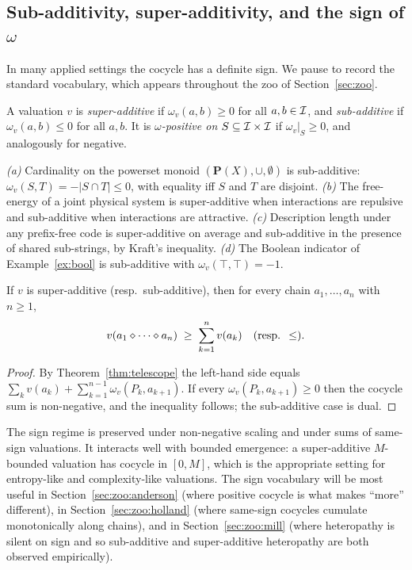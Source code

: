 \subsection*{Sub-additivity, super-additivity, and the sign of $\omega$}

In many applied settings the cocycle has a definite sign. We pause to record
the standard vocabulary, which appears throughout the zoo of
Section~\ref{sec:zoo}.

\begin{definition}\label{def:sign}
A valuation $v$ is \emph{super-additive} if $\omega_v(a,b) \ge 0$ for all
$a, b \in \mathcal{I}$, and \emph{sub-additive} if $\omega_v(a,b) \le 0$ for
all $a, b$. It is \emph{$\omega$-positive on $S \subseteq \mathcal{I}\times
\mathcal{I}$} if $\omega_v|_S \ge 0$, and analogously for negative.
\end{definition}

\begin{example}\label{ex:signs}
\textit{(a)} Cardinality on the powerset monoid $(\mathbf{P}(X), \cup,
\emptyset)$ is sub-additive: $\omega_v(S, T) = -|S \cap T| \le 0$, with
equality iff $S$ and $T$ are disjoint. \textit{(b)} The free-energy of a
joint physical system is super-additive when interactions are repulsive and
sub-additive when interactions are attractive. \textit{(c)} Description
length under any prefix-free code is super-additive on average and
sub-additive in the presence of shared sub-strings, by Kraft's inequality.
\textit{(d)} The Boolean indicator of Example~\ref{ex:bool} is sub-additive
with $\omega_v(\top,\top) = -1$.
\end{example}

\begin{lemma}\label{lem:sign-tele}
If $v$ is super-additive (resp.\ sub-additive), then for every chain
$a_1, \dots, a_n$ with $n \ge 1$,
\[
  v(a_1\mathbin{\diamond}\cdots\mathbin{\diamond} a_n) \;\ge\; \sum_{k=1}^n v(a_k)
  \quad(\text{resp. } \le).
\]
\end{lemma}

\begin{proof}
By Theorem~\ref{thm:telescope} the left-hand side equals $\sum_k v(a_k) +
\sum_{k=1}^{n-1} \omega_v(P_k, a_{k+1})$. If every $\omega_v(P_k, a_{k+1})
\ge 0$ then the cocycle sum is non-negative, and the inequality follows;
the sub-additive case is dual.
\end{proof}

The sign regime is preserved under non-negative scaling and under sums of
same-sign valuations. It interacts well with bounded emergence: a
super-additive $M$-bounded valuation has cocycle in $[0, M]$, which is the
appropriate setting for entropy-like and complexity-like valuations. The
sign vocabulary will be most useful in Section~\ref{sec:zoo:anderson} (where
positive cocycle is what makes ``more'' different), in
Section~\ref{sec:zoo:holland} (where same-sign cocycles cumulate
monotonically along chains), and in Section~\ref{sec:zoo:mill} (where
heteropathy is silent on sign and so sub-additive and super-additive
heteropathy are both observed empirically).

